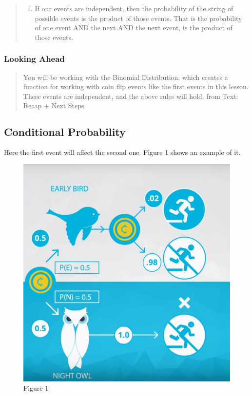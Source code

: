 \documentclass[]{book}
\providecommand{\tightlist}{%
  \setlength{\itemsep}{0pt}\setlength{\parskip}{0pt}}
\begin{document}
\begin{quote}
\begin{enumerate}
\def\labelenumi{\arabic{enumi}.}
\setcounter{enumi}{2}
\tightlist
\item
  If our events are independent, then the probability of the string of
  possible events is the product of those events. That is the
  probability of one event AND the next AND the next event, is the
  product of those events.
\end{enumerate}
\end{quote}

\subsubsection{Looking Ahead}\label{looking-ahead}

\begin{quote}
You will be working with the Binomial Distribution, which creates a
function for working with coin flip events like the first events in this
lesson. These events are independent, and the above rules will hold.
from Text: Recap + Next Steps
\end{quote}

\subsection{Conditional Probability}\label{conditional-probability}

Here the first event will affect the second one. Figure 1 shows an
example of it.

\begin{figure}
\centering
\includegraphics{01-img/c4_l6_01.png}
\caption{Figure 1}
\end{figure}
\end{document}
